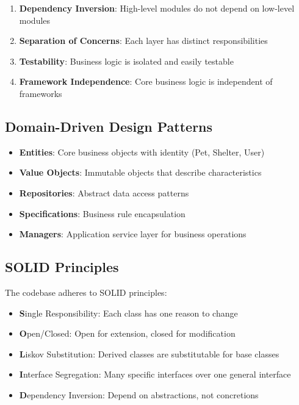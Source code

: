 \documentclass[12pt,a4paper]{article}
\begin{document}
\begin{enumerate}
    \item \textbf{Dependency Inversion}: High-level modules do not depend on low-level modules
    \item \textbf{Separation of Concerns}: Each layer has distinct responsibilities
    \item \textbf{Testability}: Business logic is isolated and easily testable
    \item \textbf{Framework Independence}: Core business logic is independent of frameworks
\end{enumerate}

\subsection{Domain-Driven Design Patterns}

\begin{itemize}
    \item \textbf{Entities}: Core business objects with identity (Pet, Shelter, User)
    \item \textbf{Value Objects}: Immutable objects that describe characteristics
    \item \textbf{Repositories}: Abstract data access patterns
    \item \textbf{Specifications}: Business rule encapsulation
    \item \textbf{Managers}: Application service layer for business operations
\end{itemize}

\subsection{SOLID Principles}

The codebase adheres to SOLID principles:
\begin{itemize}
    \item \textbf{S}ingle Responsibility: Each class has one reason to change
    \item \textbf{O}pen/Closed: Open for extension, closed for modification
    \item \textbf{L}iskov Substitution: Derived classes are substitutable for base classes
    \item \textbf{I}nterface Segregation: Many specific interfaces over one general interface
    \item \textbf{D}ependency Inversion: Depend on abstractions, not concretions
\end{itemize}
\end{document}
